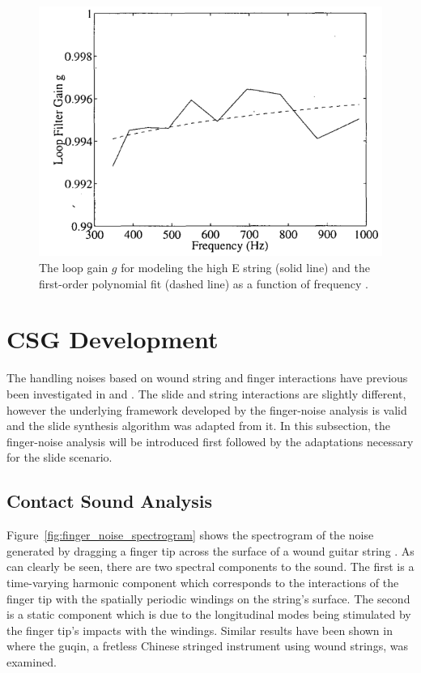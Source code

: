 \documentclass[main.tex]{subfiles}
\begin{document}
\begin{figure}[!h]
    \centering
    \includegraphics[scale=.75]{./images/plots/Figure18Orig.png}
    \caption{The loop gain $g$ for modeling the high E string (solid line) and the first-order polynomial fit (dashed line) as a function of frequency .}
    \label{fig:originalLoopGain}
\end{figure}

\clearpage

\section{CSG Development} \label{sec:CSG_dev}
The handling noises based on wound string and finger interactions have previous been investigated in  and . The slide and string interactions are slightly different, however the underlying framework developed by the finger-noise analysis is valid and the slide synthesis algorithm was adapted from it. In this subsection, the finger-noise analysis will be introduced first followed by the adaptations necessary for the slide scenario.

\subsection{Contact Sound Analysis}
Figure~\ref{fig:finger_noise_spectrogram} shows the spectrogram of the noise generated by dragging a finger tip across the surface of a wound guitar string . As can clearly be seen, there are two spectral components to the sound. The first is a time-varying harmonic component which corresponds to the interactions of the finger tip with the spatially periodic windings on the string's surface. The second is a static component which is due to the longitudinal modes being stimulated by the finger tip's impacts with the windings. Similar results have been shown in  where the guqin, a fretless Chinese stringed instrument using wound strings, was examined.
\end{document}
